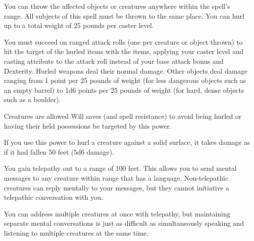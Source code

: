 \spellrng{\rngmed}
\begin{spelleffect}
  You can throw the affected objects or creatures anywhere within the spell's range. All subjects of this spell must be thrown to the same place. You can hurl up to a total weight of 25 pounds per caster level.
  \par You must succeed on ranged attack rolls (one per creature or object thrown) to hit the target of the hurled items with the items, applying your caster level and casting attribute to the attack roll instead of your base attack bonus and Dexterity. Hurled weapons deal their normal damage. Other objects deal damage ranging from 1 point per 25 pounds of weight (for less dangerous objects such as an empty barrel) to 1d6 points per 25 pounds of weight (for hard, dense objects such as a boulder).
  \par Creatures are allowed Will saves (and spell resistance) to avoid being hurled or having their held possessions be targeted by this power.
  \par If you use this power to hurl a creature against a solid surface, it takes damage as if it had fallen 50 feet (5d6 damage).
\end{spelleffect}

\spelldur{\durlong}
\begin{spelleffect}
    You gain telepathy out to a range of 100 feet. This allows you to send mental messages to any creature within range that has a language. Non-telepathic creatures can reply mentally to your messages, but they cannot initiative a telepathic conversation with you.

    You can address multiple creatures at once with telepathy, but maintaining separate mental conversations is just as difficult as simultaneously speaking and listening to multiple creatures at the same time. 
\end{spelleffect}

